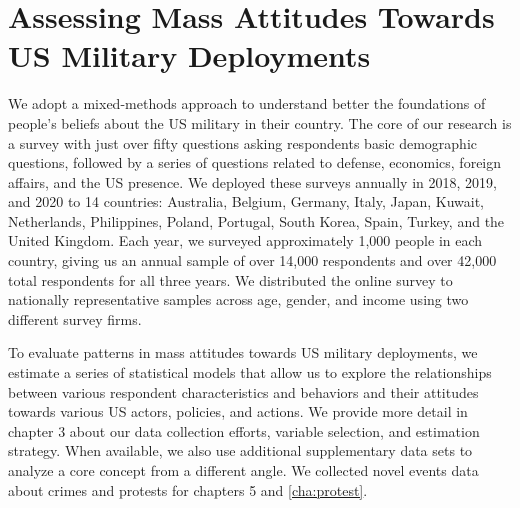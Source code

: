 \section*{Assessing Mass Attitudes Towards US Military Deployments}
We adopt a mixed-methods approach to understand better the foundations of people's beliefs about the US military in their country. The core of our research is a survey with just over fifty questions asking respondents basic demographic questions, followed by a series of questions related to defense, economics, foreign affairs, and the US presence. We deployed these surveys annually in 2018, 2019, and 2020 to 14 countries: Australia, Belgium, Germany, Italy, Japan, Kuwait, Netherlands, Philippines, Poland, Portugal, South Korea, Spain, Turkey, and the United Kingdom. Each year, we surveyed approximately 1,000 people in each country, giving us an annual sample of over 14,000 respondents and over 42,000 total respondents for all three years. We distributed the online survey to nationally representative samples across age, gender, and income using two different survey firms. 



To evaluate patterns in mass attitudes towards US military deployments, we estimate a series of statistical models that allow us to explore the relationships between various respondent characteristics and behaviors and their attitudes towards various US actors, policies, and actions. We provide more detail in chapter 3 about our data collection efforts, variable selection, and estimation strategy. When available, we also use additional supplementary data sets to analyze a core concept from a different angle. We collected novel events data about crimes and protests for chapters 5 and \ref{cha:protest}.

